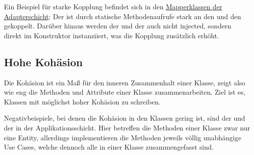 Ein Beispiel für starke Kopplung befindet sich in den \href{https://github.com/anditru/quickie/tree/bb41442c7f1ffbfcd3117cd86a40f7932e543a33/1-quickie-adapters/src/main/java/org/pinkcrazyunicorn/quickie/adapters/mappers}{Mapperklassen der Adapterschicht}: Der \href{https://github.com/anditru/quickie/blob/bb41442c7f1ffbfcd3117cd86a40f7932e543a33/1-quickie-adapters/src/main/java/org/pinkcrazyunicorn/quickie/adapters/mappers/profile/ProfileMapper.java}{} ist durch statische Methodenaufrufe stark an den \href{https://github.com/anditru/quickie/blob/bb41442c7f1ffbfcd3117cd86a40f7932e543a33/1-quickie-adapters/src/main/java/org/pinkcrazyunicorn/quickie/adapters/mappers/FoodMapper.java}{} und den \href{https://github.com/anditru/quickie/blob/bb41442c7f1ffbfcd3117cd86a40f7932e543a33/1-quickie-adapters/src/main/java/org/pinkcrazyunicorn/quickie/adapters/mappers/profile/OpinionMapper.java}{} gekoppelt. Darüber hinaus werden der \href{https://github.com/anditru/quickie/blob/bb41442c7f1ffbfcd3117cd86a40f7932e543a33/1-quickie-adapters/src/main/java/org/pinkcrazyunicorn/quickie/adapters/mappers/profile/OpinionMapper.java}{} und der \href{https://github.com/anditru/quickie/blob/bb41442c7f1ffbfcd3117cd86a40f7932e543a33/1-quickie-adapters/src/main/java/org/pinkcrazyunicorn/quickie/adapters/mappers/profile/OpinionMapper.java}{} auch nicht injected, sondern direkt im Konstruktor instanziiert, was die Kopplung zusätzlich erhöht.

\subsection{Hohe Kohäsion}
Die Kohäsion ist ein Maß für den inneren Zusammenhalt einer Klasse, zeigt also wie eng die Methoden und Attribute einer Klasse zusammenarbeiten. Ziel ist es, Klassen mit möglichst hoher Kohäsion zu schreiben.

Negativbeispiele, bei denen die Kohäsion in den Klassen gering ist, sind der \href{https://github.com/anditru/quickie/blob/bb41442c7f1ffbfcd3117cd86a40f7932e543a33/2-quickie-application/src/main/java/org/pinkcrazyunicorn/quickie/application/profile/ProfileService.java}{} und der \href{https://github.com/anditru/quickie/blob/bb41442c7f1ffbfcd3117cd86a40f7932e543a33/2-quickie-application/src/main/java/org/pinkcrazyunicorn/quickie/application/recipe/RecipeService.java}{} in der Applikationsschicht. Hier betreffen die Methoden einer Klasse zwar nur eine Entity, allerdings implementieren die Methoden jeweils völlig unabhängige Use Cases, welche dennoch alle in einer Klasse zusammengefasst sind.

